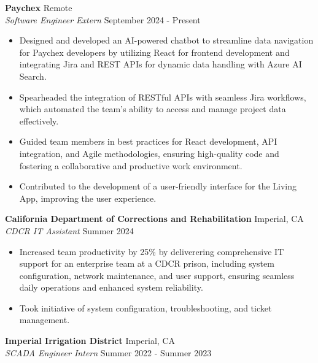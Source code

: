 \documentclass[a4paper]{article}
\begin{document}
\textbf{Paychex} \hfill Remote\\
\textit{Software Engineer Extern} \hfill September 2024 - Present\\
\vspace{-1mm}
\begin{itemize} \itemsep 1pt
	\item Designed and developed an AI-powered chatbot to streamline data navigation for Paychex developers by utilizing React for frontend development and integrating Jira and REST APIs for dynamic data handling with Azure AI Search.
	\item Spearheaded the integration of RESTful APIs with seamless Jira workflows, which automated the team’s ability to access and manage project data effectively.
	\item Guided team members in best practices for React development, API integration, and Agile methodologies, ensuring high-quality code and fostering a collaborative and productive work environment.
	\item Contributed to the development of a user-friendly interface for the Living App, improving the user experience.
\end{itemize}
\textbf{California Department of Corrections and Rehabilitation} \hfill Imperial, CA\\
\textit{CDCR IT Assistant} \hfill Summer 2024\\
\vspace{-1mm}
\begin{itemize} \itemsep 1pt
	\item Increased team productivity by 25\% by deliverering comprehensive IT support for an enterprise team at a CDCR prison, including system configuration, network maintenance, and user support, ensuring seamless daily operations and enhanced system reliability.
	\item Took initiative of system configuration, troubleshooting, and ticket management.
\end{itemize}
\textbf{Imperial Irrigation District} \hfill Imperial, CA\\
\textit{SCADA Engineer Intern} \hfill Summer 2022 - Summer 2023\\
\vspace{-1mm}
\end{document}
